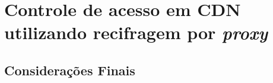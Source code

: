 \chapter{Controle de acesso em CDN utilizando recifragem por \emph{proxy}}




\section{Considerações Finais}
